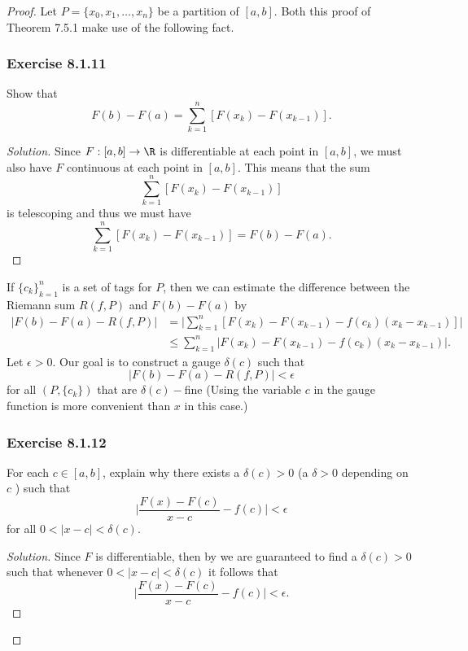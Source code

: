 \begin{proof}
    Let \( P = \{ x_{0}, x_{1}, \dots, x_{n} \}  \) be a partition of \( [a,b]  \). Both this proof of Theorem 7.5.1 make use of the following fact.



\subsubsection{Exercise 8.1.11} Show that 
    \[  F(b) - F(a) = \sum_{ k=1 }^{ n } [F(x_{k} ) - F(x_{k-1})].\]
    \begin{proof}[Solution]
    Since \( F: [a,b] \to \R  \) is differentiable at each point in \( [a,b]  \), we must also have \( F  \) continuous at each point in \( [a,b]  \). This means that the sum 
    \[  \sum_{ k=1 }^{ n }[F(x_{k }) - F(x_{k-1})] \] is telescoping and thus we must have 
    \[  \sum_{ k=1 }^{ n }[F(x_{k }) - F(x_{k-1})] = F(b) - F(a). \] 
\end{proof} 


    If \( \{ c_{k }  \}_{k=1}^{n} \) is a set of tags for \( P  \), then we can estimate the difference between the Riemann sum \( R(f,P)  \) and \( F(b) - F(a)  \) by
\begin{align*}
    | F(b) - F(a) - R(f,P)  | &= \Big| \sum_{ k=1 }^{ n } [F(x_{k}) - F(x_{k-1}) - f(c_{k}) (x_{k } - x_{k-1})] \Big|  \\
                              &\leq \sum_{ k=1 }^{ n } | F(x_{k}) - F(x_{k-1}) - f(c_{k })(x_{k } - x_{k-1}) |.
\end{align*}
Let \( \epsilon > 0  \). Our goal is to construct a gauge \( \delta(c)  \) such that 
\[  | F(b) - F(a) - R(f,P)  | < \epsilon \]
for all \( (P, \{ c_{k } \} ) \) that are \( \delta(c)- \)fine (Using the variable \( c  \) in the gauge function is more convenient than \( x  \) in this case.)


\subsubsection{Exercise 8.1.12} For each \( c \in [a,b]  \), explain why there exists a \( \delta(c) > 0  \) (a \( \delta > 0  \) depending on \( c   \) ) such that 
\[  \Big| \frac{ F(x) - F(c)  }{ x -c  }  - f(c)  \Big|  < \epsilon \]
for all \( 0 < | x -c  | < \delta(c)  \).
\begin{proof}[Solution]
Since \( F  \) is differentiable, then by we are guaranteed to find a \( \delta(c) > 0  \) such that whenever \( 0 < | x - c  |  < \delta(c)  \) it follows that 
\[  \Big| \frac{ F(x) - F(c)  }{ x -c  }  - f(c)  \Big| < \epsilon. \]




\end{proof}
\end{proof}

